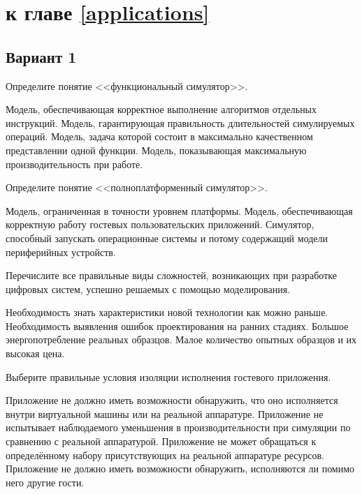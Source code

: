 \section{\Questions к главе \ref{applications}} %



\subsection*{Вариант 1}

\begin{questions}

\question[5] Определите понятие <<функциональный симулятор>>.
\begin{choices}
\correctchoice Модель, обеспечивающая корректное выполнение алгоритмов отдельных инструкций.
\choice Модель, гарантирующая правильность длительностей симулируемых операций.
\choice Модель, задача которой состоит в максимально качественном представлении одной функции.
\choice Модель, показывающая максимальную производительность при работе.
\end{choices}

\question[5] Определите понятие <<полноплатформенный симулятор>>.
\begin{choices}
\choice Модель, ограниченная в точности уровнем платформы.
\choice Модель, обеспечивающая корректную работу гостевых пользовательских приложений.
\correctchoice Симулятор, способный запускать операционные системы и потому содержащий модели периферийных устройств.
\end{choices}

\question[3] Перечислите все правильные виды сложностей, возникающих при разработке цифровых систем, успешно решаемых с помощью моделирования.
\begin{choices}
\correctchoice Необходимость знать характеристики новой технологии как можно раньше.
\correctchoice Необходимость выявления ошибок проектирования на ранних стадиях.
\choice Большое энергопотребление реальных образцов.
\correctchoice Малое количество опытных образцов и их высокая цена.
\end{choices}

\question[3] Выберите правильные условия изоляции исполнения гостевого приложения.
\begin{choices}
\correctchoice Приложение не должно иметь возможности обнаружить, что оно исполняется внутри виртуальной машины или на реальной аппаратуре.
\choice Приложение не испытывает наблюдаемого уменьшения в производительности при симуляции по сравнению с реальной аппаратурой.
\choice Приложение не может обращаться к определённому набору присутствующих на реальной аппаратуре ресурсов.
\correctchoice Приложение не должно иметь возможности обнаружить, исполняются ли помимо него другие гости.
\end{choices}


\end{questions}
